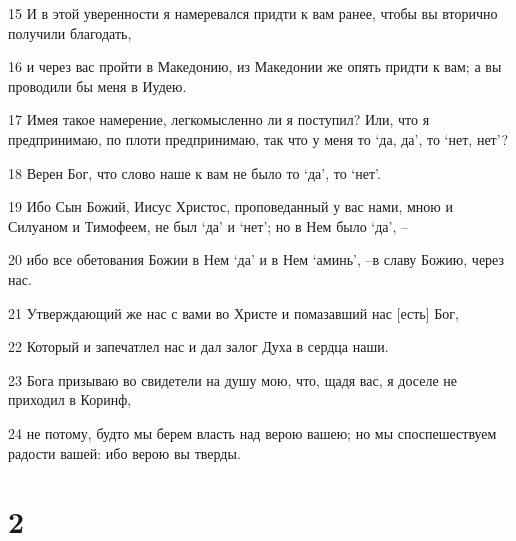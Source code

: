 \par 15 И в этой уверенности я намеревался придти к вам ранее, чтобы вы вторично получили благодать,
\par 16 и через вас пройти в Македонию, из Македонии же опять придти к вам; а вы проводили бы меня в Иудею.
\par 17 Имея такое намерение, легкомысленно ли я поступил? Или, что я предпринимаю, по плоти предпринимаю, так что у меня то `да, да', то `нет, нет'?
\par 18 Верен Бог, что слово наше к вам не было то `да', то `нет'.
\par 19 Ибо Сын Божий, Иисус Христос, проповеданный у вас нами, мною и Силуаном и Тимофеем, не был `да' и `нет'; но в Нем было `да', --
\par 20 ибо все обетования Божии в Нем `да' и в Нем `аминь', --в славу Божию, через нас.
\par 21 Утверждающий же нас с вами во Христе и помазавший нас [есть] Бог,
\par 22 Который и запечатлел нас и дал залог Духа в сердца наши.
\par 23 Бога призываю во свидетели на душу мою, что, щадя вас, я доселе не приходил в Коринф,
\par 24 не потому, будто мы берем власть над верою вашею; но мы споспешествуем радости вашей: ибо верою вы тверды.

\chapter{2}

